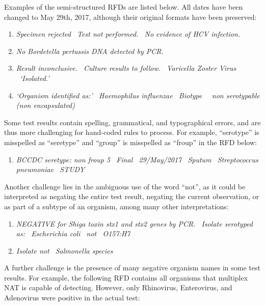 \documentclass[sigconf]{acmart}
\begin{document}
Examples of the semi-structured RFDs are listed below. All dates have been changed to May 29th, 2017, although their original formats have been preserved:

\begin{enumerate}
    \item \textit{Specimen rejected \textbar\ Test not performed. \textbar\ No evidence of HCV infection.}
    \item \textit{No Bordetella pertussis DNA detected by PCR.}
    \item \textit{Result inconclusive. \textbar\ Culture results to follow. \textbar\ Varicella Zoster Virus \textbar\ `Isolated.'}
    \item \textit{`Organism identified as:' \textbar\ Haemophilus influenzae \textbar\ Biotype \textbar\ \textbar\ non serotypable (non encapsulated)}
\end{enumerate}

Some test results contain spelling, grammatical, and typographical errors, and are thus more challenging for hand-coded rules to process. For example, ``serotype'' is misspelled as ``seretype'' and ``group'' is misspelled as ``froup'' in the RFD below:

\begin{enumerate}[resume]
    \item \textit{BCCDC seretype: non froup 5 \textbar\ Final \textbar\ 29/May/2017 \textbar\ Sputum \textbar\ Streptococcus pneumoniae \textbar\ STUDY}
\end{enumerate}

Another challenge lies in the ambiguous use of the word ``not'', as it could be interpreted as negating the entire test result, negating the current observation, or as part of a subtype of an organism, among many other interpretations:

\begin{enumerate}[resume]
    \item \textit{NEGATIVE for Shiga toxin stx1 and stx2 genes by PCR. \textbar\ Isolate serotyped as: \textbar\ Escherichia coli \textbar\ not \textbar\ O157:H7}
    \item \textit{Isolate not \textbar\ Salmonella species}
\end{enumerate}

A further challenge is the presence of many negative organism names in some test results. For example, the following RFD contains all organisms that multiplex NAT is capable of detecting. However, only Rhinovirus, Enterovirus, and Adenovirus were positive in the actual test:
\end{document}
